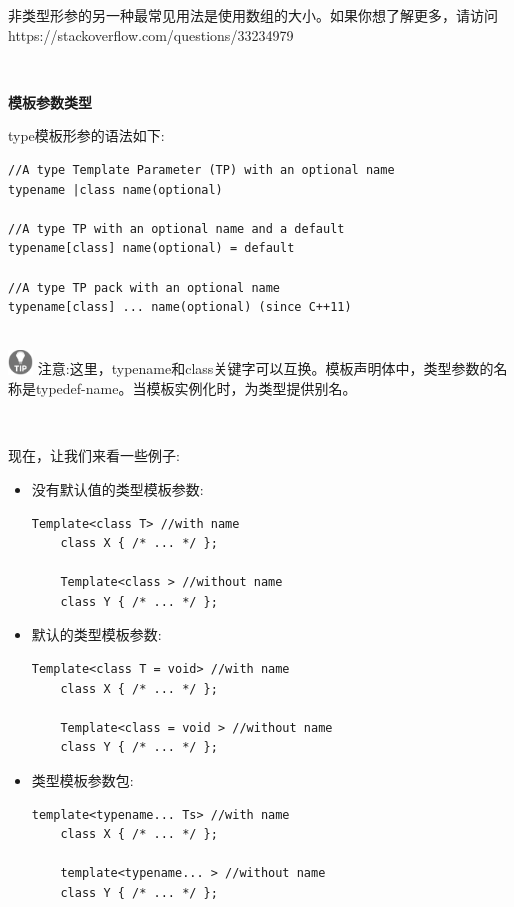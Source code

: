 非类型形参的另一种最常见用法是使用数组的大小。如果你想了解更多，请访问 https:/​/​stackoverflow.​com/​questions/​33234979 

\noindent\textbf{}\ \par
\textbf{模板参数类型} \ \par
type模板形参的语法如下: \par

\begin{lstlisting}[caption={}]
//A type Template Parameter (TP) with an optional name
typename |class name(optional)

//A type TP with an optional name and a default
typename[class] name(optional) = default

//A type TP pack with an optional name
typename[class] ... name(optional) (since C++11)
\end{lstlisting}

\hspace*{\fill} \\ %
\includegraphics[width=0.05\textwidth]{images/tip}
注意:这里，typename和class关键字可以互换。模板声明体中，类型参数的名称是typedef-name。当模板实例化时，为类型提供别名。 \par
\noindent\textbf{}\ \par

现在，让我们来看一些例子: \par

\begin{itemize}
	\item 没有默认值的类型模板参数: \par
	\begin{lstlisting}[caption={}]
	Template<class T> //with name
	class X { /* ... */ };
	
	Template<class > //without name
	class Y { /* ... */ };
	\end{lstlisting}
	\item 默认的类型模板参数: \par
	\begin{lstlisting}[caption={}]
	Template<class T = void> //with name
	class X { /* ... */ };
	
	Template<class = void > //without name
	class Y { /* ... */ };
	\end{lstlisting}
	\item 类型模板参数包: \par
	\begin{lstlisting}[caption={}]
	template<typename... Ts> //with name
	class X { /* ... */ };
	
	template<typename... > //without name
	class Y { /* ... */ };
	\end{lstlisting}
\end{itemize}

